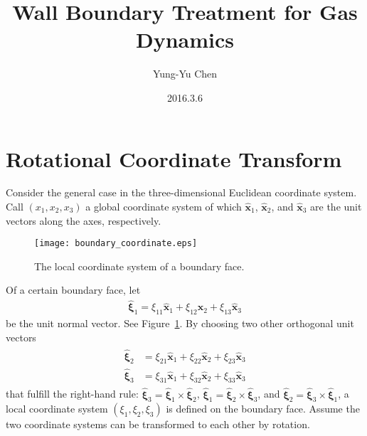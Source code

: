 \documentclass[a4paper,12pt,dvips]{article}
\begin{document}
\title{Wall Boundary Treatment for Gas Dynamics}
\author{Yung-Yu Chen}
\date{2016.3.6}

\maketitle

\tableofcontents

\hspace{.5cm}

\section{Rotational Coordinate Transform}

Consider the general case in the three-dimensional Euclidean coordinate system.
Call $(x_1, x_2, x_3)$ a global coordinate system of which
%
$\hat{\mathbf{x}}_1$, $\hat{\mathbf{x}}_2$, and $\hat{\mathbf{x}}_3$
%
are the unit vectors along the axes, respectively.

\begin{figure}[htbp]
\centering
\texttt{[image: boundary\_coordinate.eps]}
\caption{The local coordinate system of a boundary face.}
\label{f:boundary_coordinate}
\end{figure}

Of a certain boundary face, let
%
\begin{align}
  \hat{\boldsymbol{\xi}}_1
  = \xi_{11} \hat{\mathbf{x}}_1
  + \xi_{12} \hat{\mathbf{x}}_2
  + \xi_{13} \hat{\mathbf{x}}_3
  \label{e:coord:xi1}
\end{align}
%
be the unit normal vector.  See Figure~\ref{f:boundary_coordinate}.  By
choosing two other orthogonal unit vectors
%
\begin{align}
\begin{aligned}
  \hat{\boldsymbol{\xi}}_2
 &= \xi_{21} \hat{\mathbf{x}}_1
  + \xi_{22} \hat{\mathbf{x}}_2
  + \xi_{23} \hat{\mathbf{x}}_3
  \\
  \hat{\boldsymbol{\xi}}_3
 &= \xi_{31} \hat{\mathbf{x}}_1
  + \xi_{32} \hat{\mathbf{x}}_2
  + \xi_{33} \hat{\mathbf{x}}_3
\end{aligned}
\label{e:coord:xi23}
\end{align}
%
that fulfill the right-hand rule:
%
$\hat{\boldsymbol{\xi}}_3 = \hat{\boldsymbol{\xi}}_1 \times
\hat{\boldsymbol{\xi}}_2$,
%
$\hat{\boldsymbol{\xi}}_1 = \hat{\boldsymbol{\xi}}_2 \times
\hat{\boldsymbol{\xi}}_3$, and
%
$\hat{\boldsymbol{\xi}}_2 = \hat{\boldsymbol{\xi}}_3 \times
\hat{\boldsymbol{\xi}}_1$,
%
a local coordinate system $(\xi_1, \xi_2, \xi_3)$ is defined on the boundary
face.  Assume the two coordinate systems can be transformed to each other by
rotation.
\end{document}
